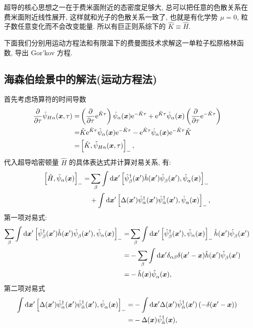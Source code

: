 超导的核心思想之一在于费米面附近的态密度足够大, 总可以把任意的色散关系在费米面附近线性展开, 这样就和光子的色散关系一致了, 也就是有化学势 $\mu=0$, 粒子数任意变化而不会改变能量. 所以有巨正则系综下的 $\hat{K}\equiv \hat{H}$. 

下面我们分别用运动方程法和有限温下的费曼图技术求解这一单粒子松原格林函数, 导出 Gor'kov 方程.
\subsection{海森伯绘景中的解法(运动方程法)}
首先考虑场算符的时间导数 
 \begin{align}
        \frac{\partial}{\partial\tau}\hat{\psi}_{H\alpha}(\boldsymbol{x},\tau)=&\left(\frac{\partial}{\partial\tau}\mathrm{e}^{\hat{K}\tau}\right) \hat{\psi}_{\alpha}(\boldsymbol{x})\mathrm{e}^{-\hat{K}\tau}+\mathrm{e}^{\hat{K}\tau}\hat{\psi}_{\alpha}(\boldsymbol{x})\left( \frac{\partial}{\partial \tau}\mathrm{e}^{-\hat{K}\tau} \right)\nonumber\\
        =&\hat{K}\mathrm{e}^{\hat{K}\tau}\hat{\psi}_{\alpha}(\boldsymbol{x})\mathrm{e}^{-\hat{K}\tau}-\mathrm{e}^{\hat{K}\tau}\hat{\psi}_{\alpha} (\boldsymbol{x})\mathrm{e}^{-\hat{K}\tau}\hat{K}\nonumber\\
        =&\left[ \hat{K},\hat{\psi}_{H\alpha}(\boldsymbol{x},\tau) \right]_-,
    \end{align}
代入超导哈密顿量 $\hat{H}$ 的具体表达式并计算对易关系, 有: 
\begin{align}
        \left[ \hat{H},\hat{\psi}_{\alpha}(\boldsymbol{x}) \right]_-=&\sum_{\beta}\int\mathrm{d}\boldsymbol{x}'\left[ \hat{\psi}_{\beta}^\dagger(\boldsymbol{x}')\hat{h}(\boldsymbol{x}')\hat{\psi}_{\beta}^{ }(\boldsymbol{x}'),\hat{\psi}_{\alpha}^{ }(\boldsymbol{x}) \right]_- \nonumber\\
&+ \int\mathrm{d}\boldsymbol{x}'\left[ \Delta(\boldsymbol{x}')\hat{\psi}_{\alpha}^\dagger (\boldsymbol{x}')\hat{\psi}_{\bar{\alpha}}^\dagger (\boldsymbol{x}'),\hat{\psi}_\alpha^{ }(\boldsymbol{x}) \right]_-,
    \end{align}
第一项对易式: 
 \begin{align}
      \sum_{\beta}\int\mathrm{d}\boldsymbol{x}'  \left[ \hat{\psi}_{\beta}^\dagger(\boldsymbol{x}')\hat{h}(\boldsymbol{x}')\hat{\psi}_{\beta}^{ }(\boldsymbol{x}'),\hat{\psi}_{\alpha}(\boldsymbol{x}) \right]_-=&\sum_{\beta}\int\mathrm{d}\boldsymbol{x}'\left[ \hat{\psi}_{\beta}^\dagger(\boldsymbol{x}'),\hat{\psi}_\alpha(\boldsymbol{x}) \right]_- \hat{h}(\boldsymbol{x}')\hat{\psi}_\beta^{ }(\boldsymbol{x}')\nonumber\\
        =&-\sum_{\beta}\int\mathrm{d}\boldsymbol{x}'\delta_{\alpha\beta}\delta(\boldsymbol{x}'-\boldsymbol{x})\hat{h}(\boldsymbol{x}')\hat{\psi}_{\beta}^{ }(\boldsymbol{x}')\nonumber\\
        =&-\hat{h}(\boldsymbol{x})\hat{\psi}_{\alpha}^{ }(\boldsymbol{x}),
    \end{align}
第二项对易式
 \begin{align}
       \int\mathrm{d}\boldsymbol{x}' \left[ \Delta(\boldsymbol{x}')\hat{\psi}_{\alpha}^\dagger(\boldsymbol{x}')\hat{\psi}_{\bar{\alpha}}^\dagger (\boldsymbol{x}'), \hat{\psi}_{\alpha}^{ }(\boldsymbol{x})\right]_-=&-\int\mathrm{d}\boldsymbol{x}'\Delta(\boldsymbol{x}')\hat{\psi}_{\bar{\alpha}}^\dagger(\boldsymbol{x}')\left( -\delta(\boldsymbol{x}'-\boldsymbol{x}) \right)\nonumber\\
        =&-\Delta(\boldsymbol{x})\hat{\psi}_{\bar{\alpha}}^\dagger(\boldsymbol{x}),
    \end{align}
